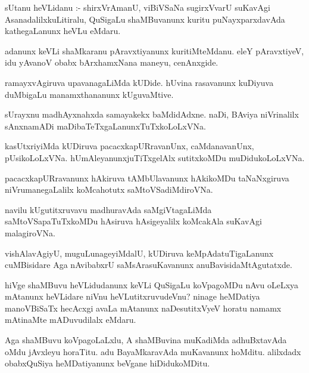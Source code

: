 \documentclass{article}
\begin{document}
\begin{mn}
sUtanu  heVLidanu :-  shirxVrAmanU,  viBiVSaNa  sugirxVvarU  suKavAgi  AsanadalilxkuLitiralu,  QuSigaLu  shaMBuvanunx  kuritu  
puNayxparxdavAda  kathegaLanunx  heVLu  eMdaru.
\end{mn}

\begin{mn}
adanunx  keVLi  shaMkaranu  pAravxtiyanunx  kuritiMteMdanu.  eleY  pAravxtiyeV,  idu  yAvanoV  obabx  bArxhamxNana  maneyu,  cenAnxgide.
\end{mn}

\begin{mn}
ramayxvAgiruva  upavanagaLiMda  kUDide.  hUvina  rasavanunx  kuDiyuva  duMbigaLu  manamxthananunx  kUguvaMtive.
\end{mn}

\begin{mn}
sUrayxnu  madhAyxnahxda  samayakekx  baMdidAdxne.  naDi,  BAviya  niVrinalilx  sAnxnamADi  maDibaTeTxgaLanunxTuTxkoLoLxVNa.
\end{mn}

\begin{mn}
kasUtxriyiMda  kUDiruva  pacacxkapURravanUnx,  caMdanavanUnx,  pUsikoLoLxVNa.  hUmAleyanunxjuTiTxgelAlx  sutitxkoMDu  muDidukoLoLxVNa.
\end{mn}

\begin{mn}
pacacxkapURravanunx  hAkiruva  tAMbUlavanunx  hAkikoMDu  taNaNxgiruva  niVrumanegaLalilx  koMcahotutx  saMtoVSadiMdiroVNa.
\end{mn}

\begin{mn}
navilu  kUgutitxruvavu  madhuravAda  saMgiVtagaLiMda  saMtoVSapaTuTxkoMDu  hAsiruva  hAsigeyalilx  koMcakAla  suKavAgi  malagiroVNa.
\end{mn}

\begin{mn}
vishAlavAgiyU,  muguLunageyiMdalU,  kUDiruva  keMpAdatuTigaLanunx  cuMBisidare  Aga  nAvibabxrU  saMsArasuKavanunx  anuBavisidaMtAgutatxde.
\end{mn}

\begin{mn}
hiVge  shaMBuvu  heVLidudanunx  keVLi  QuSigaLu  koVpagoMDu  nAvu  oLeLxya  mAtanunx  heVLidare  niVnu  heVLutitxruvudeVnu?  ninage  
heMDatiya  manoVBiSaTx  hecAcxgi  avaLa  mAtanunx  naDesutitxVyeV  horatu  namamx  mAtinaMte  mADuvudilalx  eMdaru.
\end{mn}

\begin{mn}
Aga  shaMBuvu  koVpagoLaLxlu,  A  shaMBuvina  muKadiMda  adhuBxtavAda  oMdu  jAvxleyu  horaTitu.  adu  BayaMkaravAda  
muKavanunx  hoMditu.  alilxdadx  obabxQuSiya  heMDatiyanunx  beVgane  hiDidukoMDitu.
\end{mn}
\end{document}
